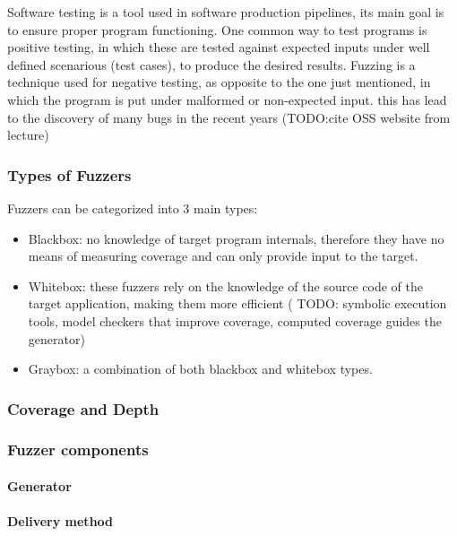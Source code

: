 Software testing is a tool used in software production pipelines, its main goal is to ensure proper program functioning. One common way to test programs is 
positive testing, in which these are tested against expected inputs under well defined scenarious (test cases), to produce the desired results.
Fuzzing is a technique used for negative testing, as opposite to the one just mentioned, in which the program is put under malformed or non-expected input. this
has lead to the discovery of many bugs in the recent years (TODO:\@ cite OSS website from lecture)


\subsubsection{Types of Fuzzers}
 
Fuzzers can be categorized into 3 main types\cite{fetzer20}:

\begin{itemize}
    \item Blackbox: no knowledge of target program internals, therefore they have no means of measuring coverage and can only provide input to the target.
    \item Whitebox: these fuzzers rely on the knowledge of the source code of the target application, making them more efficient ( TODO: symbolic execution tools, model checkers that improve coverage, computed coverage guides the generator)
    \item Graybox: a combination of both blackbox and whitebox types.
\end{itemize}


\subsubsection{Coverage and Depth}

\subsubsection{Fuzzer components}

\paragraph{Generator}

\paragraph{Delivery method}

